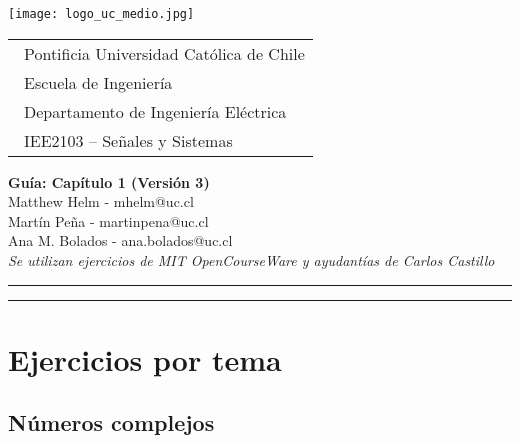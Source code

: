 \documentclass[letterpaper, 12pt]{article}
\begin{document}
\vspace*{-1cm}
\texttt{[image: logo\_uc\_medio.jpg]}
\vspace*{-2cm}

\hspace*{2cm}
 \begin{tabular}{l}
  {\ Pontificia Universidad Católica de Chile}\\
  {\ Escuela de Ingeniería}\\
  {\ Departamento de Ingeniería Eléctrica}\\
  {\ IEE2103 – Señales y Sistemas}\
 \end{tabular}
 \hfill 
\vspace*{1mm}
\begin{center}
{\LARGE\bf Guía: Capítulo 1 (Versión 3)}\\
\vspace*{2mm}
Matthew Helm - mhelm@uc.cl\\
Martín Peña  - martinpena@uc.cl\\
Ana M. Bolados - ana.bolados@uc.cl\\
\textit{Se utilizan ejercicios de MIT OpenCourseWare y ayudantías de Carlos Castillo}


\end{center}
\hrule\vspace*{2pt}\hrule

\setlength{\parindent}{0pt}
\vspace*{10pt}
\section*{Ejercicios por tema}


\subsection*{Números complejos}
\end{document}
